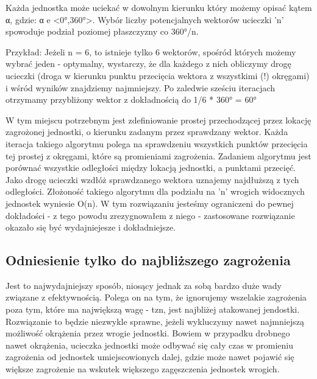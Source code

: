 \documentclass[12pt]{report}
\begin{document}
Każda jednostka może uciekać w dowolnym kierunku który możemy opisać kątem α, gdzie:
α e <0°,360°>.
Wybór liczby potencjalnych wektorów ucieczki 'n' spowoduje podział poziomej płaszczyzny co 360°/n.

Przykład:
Jeżeli n = 6, to istnieje tylko 6 wektorów, spośród których możemy wybrać jeden - optymalny, wystarczy, że dla każdego z nich obliczymy drogę ucieczki (droga w kierunku punktu przecięcia wektora z wszystkimi (!) okręgami) i wśród wyników znajdziemy najmniejszy. Po zaledwie sześciu iteracjach otrzymamy przybliżony wektor z dokładnością do 1/6 * 360° = 60°

W tym miejscu potrzebnym jest zdefiniowanie prostej przechodzącej przez lokację zagrożonej jednostki, o kierunku zadanym przez sprawdzany wektor. Każda iteracja takiego algorytmu polega na sprawdzeniu wszystkich punktów przecięcia tej prostej z okręgami, które są promieniami zagrożenia. Zadaniem algorytmu jest porównać wszystkie odległości między lokacją jednostki, a punktami przecięć. Jako drogę ucieczki wzdłóż sprawdzanego wektora uznajemy najdłuższą z tych odległości. Złożoność takiego algorytmu dla podziału na 'n' wrogich widocznych jednostek wyniesie O(n). W tym rozwiązaniu jesteśmy ograniczeni do pewnej dokładości - z tego powodu zrezygnowałem z niego - zastosowane rozwiązanie okazało się być wydajniejesze i dokładniejsze.

\subsection{Odniesienie tylko do najbliższego zagrożenia}
Jest to najwydajniejszy sposób, niosący jednak za sobą bardzo duże wady związane z efektywnością. Polega on na tym, że ignorujemy wszelakie zagrożenia poza tym, które ma największą wagę - tzn, jest najbliżej atakowanej jendostki. Rozwiązanie to będzie niezwykle sprawne, jeżeli wykluczymy nawet najmniejszą możliwość okrążenia przez wrogie jednostki. Bowiem w przypadku drobnego nawet okrążenia, ucieczka jednostki może odbywać się cały czas w promieniu zagrożenia od jednostek umiejscowionych dalej, gdzie może nawet pojawić się większe zagrożenie na wskutek większego zagęszczenia jednostek wrogich.
\end{document}
